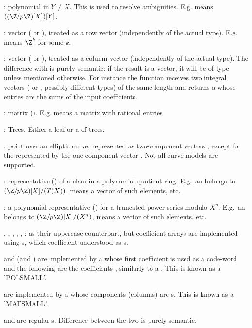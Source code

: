   : polynomial in $Y\neq X$. This is used to resolve ambiguities.
           E.g.  means $((\Z/p\Z)[X])[Y]$.

  : vector ( or ), treated as a row vector
  (independently of the actual type). E.g.  means $\Z^k$ for some $k$.

  : vector ( or ), treated as a column vector
  (independently of the actual type). The difference with  is purely
  semantic: if the result is a vector, it will be of type  unless
  mentioned otherwise. For instance the function  receives two
  integral vectors ( or , possibly different types) of the
  same length and returns a  whose entries are the sums of the input
  coefficients.

  : matrix (). E.g.  means a matrix with rational
  entries

  : Trees. Either a leaf or a  of trees.

  : point over an elliptic curve, represented
  as two-component vectors \kbd{[x,y]}, except for the  represented by the
  one-component vector \kbd{[0]}. Not all curve models are supported.

  : representative () of a class in a polynomial quotient ring.
  E.g.~an  belongs to $(\Z/p\Z)[X]/(T(X))$,  means a
  vector of such elements, etc.

  : a polynomial representative () for a truncated power
  series modulo $X^n$. E.g.~an  belongs to $(\Z/p\Z)[X]/(X^n)$,
   means a vector of such elements, etc.

  , , , , , : as their uppercase
  counterpart, but coefficient arrays are implemented using s,
  which coefficient understood as s.

   and  (and ) are implemented by a  whose
  first coefficient is used as a code-word and the following are the
  coefficients , similarly to a . This is known as a 'POLSMALL'.

   are implemented by a  whose components (columns) are
  s. This is known as a 'MATSMALL'.

   and  are regular s. Difference between the
  two is purely semantic.

